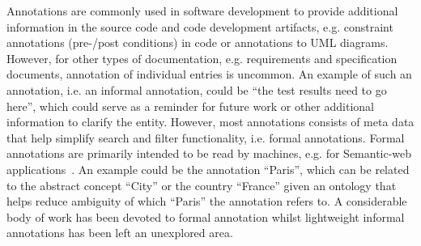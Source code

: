 \documentclass[conference]{IEEEtran}
\begin{document}
Annotations are commonly used in software development to provide additional information in the source code and code development artifacts, e.g. constraint annotations (pre-/post conditions) in code or annotations to UML diagrams.
However, for other types of documentation, e.g. requirements and specification documents, annotation of individual entries is uncommon.
An example of such an annotation, i.e. an informal annotation, could be ``the test results need to go here'', which could serve as a reminder for future work or other additional information to clarify the entity.
However, most annotations consists of meta data that help simplify search and filter functionality, i.e. formal annotations.
Formal annotations are primarily intended to be read by machines, e.g. for Semantic-web applications~\cite{uren2006semantic}.
An example could be the annotation ``Paris'', which can be related to the abstract concept ``City'' or the country ``France'' given an ontology that helps reduce ambiguity of which ``Paris'' the annotation refers to. 
A considerable body of work has been devoted to formal annotation whilst lightweight informal annotations has been left an unexplored area.

\end{document}
